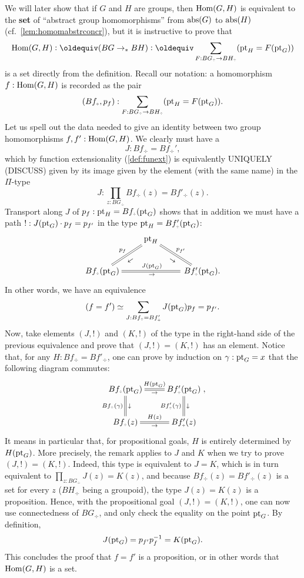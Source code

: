 \begin{example}
  We will later show that if $G$ and $H$ are groups, then $\mathrm{Hom}(G,H)$
  is equivalent to the {\bf set} of ``abstract group homomorphisms''
  from $\mathrm{abs}(G)$ to $\mathrm{abs}(H)$ (cf.\ \cref{lem:homomabstrconcr}),
  but it is instructive to prove that
  $$\Hom(G,H)\defequi(BG\ptdto BH)\defequi\sum_{F:BG_\div\to BH_\div}(\pt_H=F(\pt_G))$$ 
  is a set directly from the definition. Recall our notation: a
  homomorphism $f:\mathrm{Hom}(G,H)$ is recorded as the pair
  \begin{displaymath}
    (Bf_\div,p_f):\sum_{F:BG_\div\to BH_\div}(\pt_H=F(\pt_G)).
  \end{displaymath}
  Let us spell out the data needed to give an identity between two
  group homomorphisms $f,f':\mathrm{Hom}(G,H)$.  We clearly must have a
  $$J:Bf_\div=Bf_\div',$$
  which by function extensionality (\cref{def:funext}) is equivalently
  UNIQUELY (DISCUSS) given by its image given by the element (with the same
  name) in the $\Pi$-type
  $$J:\prod_{z:BG_\div}Bf_\div(z)=Bf'_\div(z).$$ 
  Transport along $J$ of $p_f:\pt_H=Bf_\div(\pt_G)$ shows that in
  addition we must have a path $!:J(\mathrm{pt}_G)\cdot p_f=p_{f'}$ in the
  type ${\pt_H=Bf'_\div(\pt_G)}$:
  \begin{displaymath}
    \xymatrix{&\pt_H\ar@{=}[dl]_{p_f}^{\rotatebox{35}{\footnotesize$\gets$}}
      \ar@{=}[dr]^{p_{f'}}_{\rotatebox{-35}{\footnotesize$\to$}}&\\
      Bf_\div(\pt_G)\ar@{=}[rr]^{J(\pt_G)}_\to&&\,Bf'_\div(\pt_G).}
  \end{displaymath}
  In other words, we have an equivalence
  $$(f=f')\simeq \sum_{J:Bf_\div=Bf'_\div}J(\pt_G)p_f=p_{f'}.$$
  Now, take elements $(J,!)$ and $(K,!)$ of the type in the right-hand
  side of the previous equivalence and prove that $(J,!) = (K,!)$ has
  an element. Notice that, for any $H:Bf_\div = Bf'_\div$, one can
  prove by induction on $\gamma:\mathrm{pt}_G=x$ that the following diagram
  commutes:
  $$\xymatrix{
    Bf_\div(\pt_G)\ar@{=}[r]^{H(\pt_G)}_\to\ar@{=}[d]^\downarrow_{Bf_\div(\gamma)}&
    Bf'_\div(\pt_G)\ar@{=}[d]^\downarrow_{Bf'_\div(\gamma)}\\
    Bf_\div(z)\ar@{=}[r]^{H(z)}_\to&Bf'_\div(z)},
  $$
  It means in particular that, for propositional goals, $H$ is
  entirely determined by $H(\mathrm{pt}_G)$. More precisely, the remark
  applies to $J$ and $K$ when we try to prove $(J,!) = (K,!)$. Indeed,
  this type is equivalent to $J=K$, which is in turn equivalent to
  $\prod_{z:BG_\div}J(z)=K(z)$, and because $Bf_\div(z)=Bf'_\div(z)$
  is a set for every $z$ ($BH_\div$ being a groupoid), the type
  $J(z)=K(z)$ is a proposition. Hence, with the propositional goal
  $(J,!) = (K,!)$, one can now use connectedness of $BG_\div$, and
  only check the equality on the point $\mathrm{pt}_G$. By definition,
  \begin{displaymath}
    J(\mathrm{pt}_G) = p_{f'}p_f^{-1} = K(\mathrm{pt}_G).
  \end{displaymath}
  This concludes the proof that $f=f'$ is a proposition, or in other
  words that $\mathrm{Hom}(G,H)$ is a set.


\end{example}
